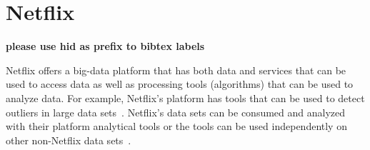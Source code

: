 \section{Netflix}

{\bf please use  hid as prefix to bibtex labels}

Netflix offers a big-data platform that has both data and services that can be
used to access data as well as processing tools (algorithms) that can be used
to analyze data.  For example, Netflix's platform has tools that can be used to
detect outliers in large data sets~\cite{Wong2015}.  Netflix’s data sets can be
consumed and analyzed with their platform analytical tools or the tools can be
used independently on other non-Netflix data sets~\cite{Netflix2018}.

